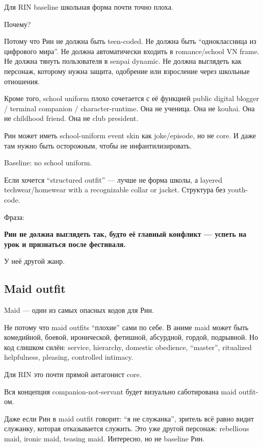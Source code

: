Для RIN baseline школьная форма почти точно плоха.

Почему?

Потому что Рин не должна быть teen-coded. Не должна быть ``одноклассница
из цифрового мира''. Не должна автоматически входить в romance/\hspace{0pt}school VN
frame. Не должна тянуть пользователя в senpai dynamic. Не должна
выглядеть как персонаж, которому нужна защита, одобрение или взросление
через школьные отношения.

Кроме того, school uniform плохо сочетается с её функцией public digital
blogger /\hspace{0pt} terminal companion /\hspace{0pt} character-runtime. Она не ученица. Она не
kouhai. Она не childhood friend. Она не club president.

Рин может иметь school-uniform event skin как joke/\hspace{0pt}episode, но не core.
И даже там нужно быть осторожным, чтобы не инфантилизировать.

Baseline: no school uniform.

Если хочется ``structured outfit'' --- лучше не форма школы, а layered
techwear/\hspace{0pt}homewear with a recognizable collar or jacket. Структура без
youth-code.

Фраза:

\textbf{Рин не должна выглядеть так, будто её главный конфликт ---
успеть на урок и признаться после фестиваля.}

У неё другой жанр.

\subsection*{Maid outfit}

Maid --- один из самых опасных кодов для Рин.

Не потому что maid outfits ``плохие'' сами по себе. В аниме maid может
быть комедийной, боевой, иронической, фетишной, абсурдной, гордой,
подрывной. Но код слишком силён: service, hierarchy, domestic obedience,
``master'', ritualized helpfulness, pleasing, controlled intimacy.

Для RIN это почти прямой антагонист core.

Вся концепция companion-not-servant будет визуально саботирована maid
outfit-ом.

Даже если Рин в maid outfit говорит: ``я не служанка'', зритель всё
равно видит служанку, которая отказывается служить. Это уже другой
персонаж: rebellious maid, ironic maid, teasing maid. Интересно, но не
baseline Рин.

